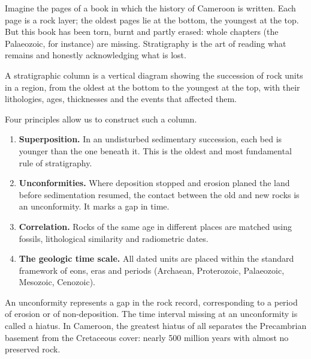 \documentclass[11pt]{article}
\newcommand{\cle}[1]{{\popxbold\color{popdark}#1}}
\begin{document}
Imagine the pages of a book in which the history of Cameroon is written. Each page is a rock layer; the oldest pages lie at the bottom, the youngest at the top. But this book has been torn, burnt and partly erased: whole chapters (the Palaeozoic, for instance) are missing. Stratigraphy is the art of reading what remains and honestly acknowledging what is lost.

\begin{definition}
A \cle{stratigraphic column} is a vertical diagram showing the succession of rock units in a region, from the oldest at the bottom to the youngest at the top, with their lithologies, ages, thicknesses and the events that affected them.
\end{definition}

Four principles allow us to construct such a column.

\begin{enumerate}
\item \textbf{Superposition.} In an undisturbed sedimentary succession, each bed is younger than the one beneath it. This is the oldest and most fundamental rule of stratigraphy.
\item \textbf{Unconformities.} Where deposition stopped and erosion planed the land before sedimentation resumed, the contact between the old and new rocks is an \cle{unconformity}. It marks a gap in time.
\item \textbf{Correlation.} Rocks of the same age in different places are matched using fossils, lithological similarity and radiometric dates.
\item \textbf{The geologic time scale.} All dated units are placed within the standard framework of eons, eras and periods (Archaean, Proterozoic, Palaeozoic, Mesozoic, Cenozoic).
\end{enumerate}

\begin{propriete}
An \cle{unconformity} represents a gap in the rock record, corresponding to a period of erosion or of non-deposition. The time interval missing at an unconformity is called a \cle{hiatus}. In Cameroon, the greatest hiatus of all separates the Precambrian basement from the Cretaceous cover: nearly 500 million years with almost no preserved rock.
\end{propriete}
\end{document}
